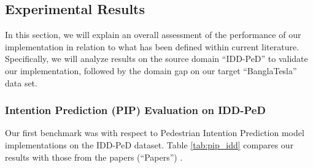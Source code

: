 \documentclass[12pt, a4paper]{article}
\begin{document}
\subsection{Experimental Results}
In this section, we will explain an overall assessment of the performance of our implementation in relation to what has been defined within current literature. Specifically, we will analyze results on the source domain ``IDD-PeD'' to validate our implementation, followed by the domain gap on our target ``BanglaTesla'' data set.

\subsubsection{Intention Prediction (PIP) Evaluation on IDD-PeD}
Our first benchmark was with respect to Pedestrian Intention Prediction model implementations on the IDD-PeD dataset. Table \ref{tab:pip_idd} compares our results with those from the papers (``Papers'') \cite{bokkasam2025pedestrian}.


\end{document}
